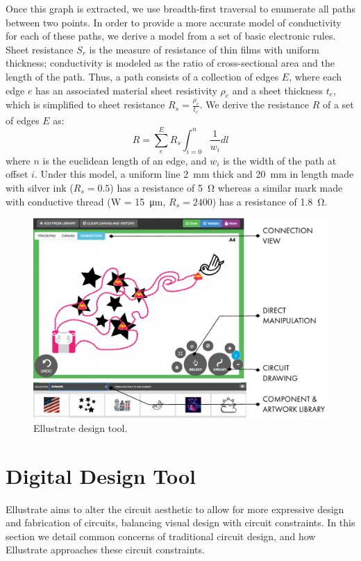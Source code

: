 \documentclass{sigchi}
\begin{document}
      
      Once this graph is extracted, we use breadth-first traversal to enumerate all paths between two points. In order to provide a more accurate model of conductivity for each of these paths, we derive a model from a set of basic electronic rules. Sheet resistance $S_r$ is the measure of resistance of thin films with uniform thickness; conductivity is modeled as the ratio of cross-sectional area and the length of the path. Thus, a path consists of a collection of edges $E$, where each edge $e$ has an associated material sheet resistivity $\rho_e$ and a sheet thickness $t_e$, which is simplified to sheet resistance $R_s = \frac{\rho_e}{t_e}$. We derive the resistance $R$ of a set of edges $E$ as:
        \begin{equation}
            R =  \sum^{E}_e R_s \int_{i=0}^{n}  \frac{1}{w_i} dl
        \label{eq:resistance}
        \end{equation}
      where $n$ is the euclidean length of an edge, and $w_i$ is the width of the path at offset $i$. Under this model, a uniform line \SI{2}{\milli\metre} thick and \SI{20}{\milli\metre} in length made with silver ink ($R_s = 0.5$) has a resistance of \SI{5}{\ohm} whereas a similar mark made with conductive thread (W = \SI{15}{\micro\metre}, $R_s = 2400$) has a resistance of \SI{1.8}{\ohm}.

    \begin{figure}[t]
    \centering
    \includegraphics[width=1.0\columnwidth]{figures/designtool.pdf}
    \caption{Ellustrate design tool. }
    \label{fig:design_tool}
    \end{figure}
    
\section{Digital Design Tool}
    Ellustrate aims to alter the circuit aesthetic to allow for more expressive design and fabrication of circuits, balancing visual design with circuit constraints. In this section we detail common concerns of traditional circuit design, and how Ellustrate approaches these circuit constraints.
\end{document}
